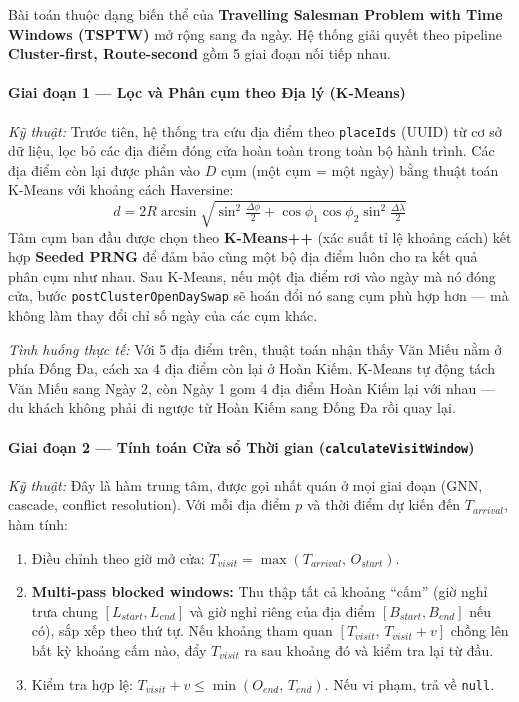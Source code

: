\documentclass[12pt,a4paper]{article}
\begin{document}
Bài toán thuộc dạng biến thể của \textbf{Travelling Salesman Problem with Time
Windows (TSPTW)} mở rộng sang đa ngày. Hệ thống giải quyết theo pipeline
\textbf{Cluster-first, Route-second} gồm 5 giai đoạn nối tiếp nhau.

\paragraph{Giai đoạn 1 --- Lọc và Phân cụm theo Địa lý (K-Means)}

\textit{Kỹ thuật:} Trước tiên, hệ thống tra cứu địa điểm theo \texttt{placeIds}
(UUID) từ cơ sở dữ liệu, lọc bỏ các địa điểm đóng cửa hoàn toàn trong toàn bộ
hành trình. Các địa điểm còn lại được phân vào $D$ cụm (một cụm = một ngày)
bằng thuật toán K-Means với khoảng cách Haversine:
\[
  d = 2R \arcsin\!\sqrt{
    \sin^2\!\tfrac{\Delta\phi}{2}
    + \cos\phi_1\cos\phi_2\sin^2\!\tfrac{\Delta\lambda}{2}
  }
\]
Tâm cụm ban đầu được chọn theo \textbf{K-Means++} (xác suất tỉ lệ khoảng cách)
kết hợp \textbf{Seeded PRNG} để đảm bảo cùng một bộ địa điểm luôn cho ra kết
quả phân cụm như nhau. Sau K-Means, nếu một địa điểm rơi vào ngày mà nó đóng
cửa, bước \texttt{postClusterOpenDaySwap} sẽ hoán đổi nó sang cụm phù hợp hơn
--- mà không làm thay đổi chỉ số ngày của các cụm khác.

\medskip
\textit{Tình huống thực tế:} Với 5 địa điểm trên, thuật toán nhận thấy
Văn Miếu nằm ở phía Đống Đa, cách xa 4 địa điểm còn lại ở Hoàn Kiếm. K-Means
tự động tách Văn Miếu sang Ngày 2, còn Ngày 1 gom 4 địa điểm Hoàn Kiếm lại với
nhau --- du khách không phải đi ngược từ Hoàn Kiếm sang Đống Đa rồi quay lại.

\paragraph{Giai đoạn 2 --- Tính toán Cửa sổ Thời gian (\texttt{calculateVisitWindow})}

\textit{Kỹ thuật:} Đây là hàm trung tâm, được gọi nhất quán ở mọi giai đoạn
(GNN, cascade, conflict resolution). Với mỗi địa điểm $p$ và thời điểm dự kiến
đến $T_{arrival}$, hàm tính:
\begin{enumerate}
  \item Điều chỉnh theo giờ mở cửa: $T_{visit} = \max(T_{arrival},\, O_{start})$.
  \item \textbf{Multi-pass blocked windows:} Thu thập tất cả khoảng ``cấm''
        (giờ nghỉ trưa chung $[L_{start}, L_{end}]$ và giờ nghỉ riêng của địa
        điểm $[B_{start}, B_{end}]$ nếu có), sắp xếp theo thứ tự. Nếu khoảng
        tham quan $[T_{visit},\, T_{visit}+v]$ chồng lên bất kỳ khoảng cấm nào,
        đẩy $T_{visit}$ ra sau khoảng đó và kiểm tra lại từ đầu.
  \item Kiểm tra hợp lệ: $T_{visit}+v \le \min(O_{end},\, T_{end})$. Nếu vi
        phạm, trả về \texttt{null}.
\end{enumerate}
\end{document}
